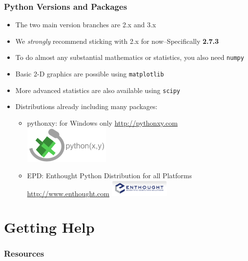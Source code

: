 \documentclass{beamer}
\begin{document}
\begin{frame}[fragile]
\frametitle{Python Versions and Packages}
\begin{itemize}
\item{The two main version branches are 2.x and 3.x}
\item{We \emph{strongly} recommend sticking with 2.x \newline{}for now--Specifically \bf{2.7.3}}
\item{To do almost any substantial mathematics or statistics, you also need \texttt{numpy}}
\item{Basic 2-D graphics are possible using \texttt{matplotlib}}
\item{More advanced statistics are also available using \texttt{scipy}}
\item{Distributions already including many packages:}
\begin{itemize}
\item {pythonxy: for Windows only \url{http://pythonxy.com}\includegraphics[scale=0.4]{figures/pythonxy.png}}
\item {EPD: Enthought Python Distribution for all Platforms \url{http://www.enthought.com}
\includegraphics[width=3cm,height=.86cm]{figures/enthought.png}}
\end{itemize}
\end{itemize}
\end{frame}

\section {Getting Help}
\begin{frame}[fragile]
\frametitle{Resources}
\end{frame}
\end{document}
